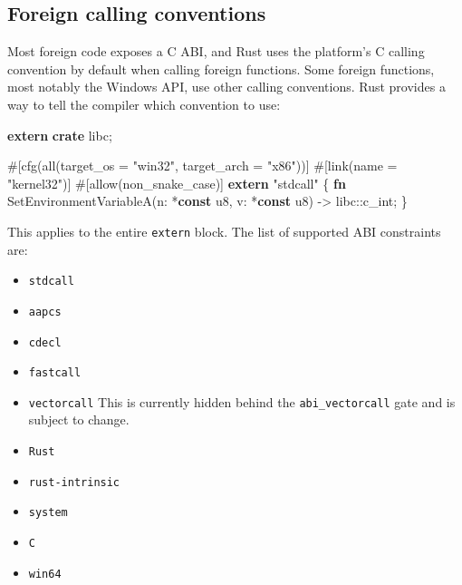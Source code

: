 \documentclass[a4paper,]{book}
\renewcommand*{\hypertarget}[3][\ar]{%
  \def\ar{#2}%
  \label{#1}%
  #3}
\newenvironment{Shaded}{\begin{snugshade}}{\end{snugshade}}
\newcommand{\KeywordTok}[1]{\textcolor[rgb]{0.13,0.29,0.53}{\textbf{{#1}}}}
\newcommand{\DataTypeTok}[1]{\textcolor[rgb]{0.13,0.29,0.53}{{#1}}}
\newcommand{\StringTok}[1]{\textcolor[rgb]{0.31,0.60,0.02}{{#1}}}
\newcommand{\AttributeTok}[1]{\textcolor[rgb]{0.77,0.63,0.00}{{#1}}}
\newcommand{\NormalTok}[1]{{#1}}
\providecommand{\tightlist}{%
  \setlength{\itemsep}{0pt}\setlength{\parskip}{0pt}}
\begin{document}
\hypertarget{foreign-calling-conventions}{\subsection{Foreign calling
conventions}\label{foreign-calling-conventions}}

Most foreign code exposes a C ABI, and Rust uses the platform's C
calling convention by default when calling foreign functions. Some
foreign functions, most notably the Windows API, use other calling
conventions. Rust provides a way to tell the compiler which convention
to use:

\begin{Shaded}
\begin{Highlighting}[]
\KeywordTok{extern} \KeywordTok{crate} \NormalTok{libc;}

\AttributeTok{#[}\NormalTok{cfg}\AttributeTok{(}\NormalTok{all}\AttributeTok{(}\NormalTok{target_os }\AttributeTok{=} \StringTok{"win32"}\AttributeTok{,} \NormalTok{target_arch }\AttributeTok{=} \StringTok{"x86"}\AttributeTok{))]}
\AttributeTok{#[}\NormalTok{link}\AttributeTok{(}\NormalTok{name }\AttributeTok{=} \StringTok{"kernel32"}\AttributeTok{)]}
\AttributeTok{#[}\NormalTok{allow}\AttributeTok{(}\NormalTok{non_snake_case}\AttributeTok{)]}
\KeywordTok{extern} \StringTok{"stdcall"} \NormalTok{\{}
    \KeywordTok{fn} \NormalTok{SetEnvironmentVariableA(n: *}\KeywordTok{const} \DataTypeTok{u8}\NormalTok{, v: *}\KeywordTok{const} \DataTypeTok{u8}\NormalTok{) -> libc::}\DataTypeTok{c_int}\NormalTok{;}
\NormalTok{\}}
\end{Highlighting}
\end{Shaded}

This applies to the entire \texttt{extern} block. The list of supported
ABI constraints are:

\begin{itemize}
\tightlist
\item
  \texttt{stdcall}
\item
  \texttt{aapcs}
\item
  \texttt{cdecl}
\item
  \texttt{fastcall}
\item
  \texttt{vectorcall} This is currently hidden behind the
  \texttt{abi\_vectorcall} gate and is subject to change.
\item
  \texttt{Rust}
\item
  \texttt{rust-intrinsic}
\item
  \texttt{system}
\item
  \texttt{C}
\item
  \texttt{win64}
\end{itemize}
\end{document}
